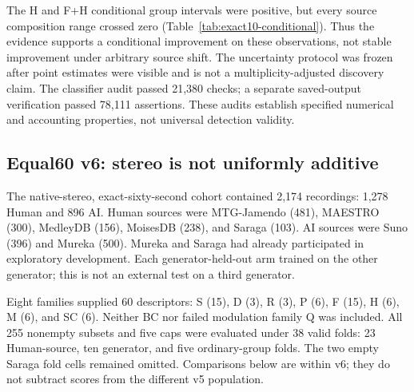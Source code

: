 The H and F+H conditional group intervals were positive, but every source
composition range crossed zero (Table~\ref{tab:exact10-conditional}). Thus the
evidence supports a conditional improvement on these observations, not stable
improvement under arbitrary source shift. The uncertainty protocol was frozen
after point estimates were visible and is not a multiplicity-adjusted discovery
claim. The classifier audit passed 21,380 checks; a separate saved-output
verification passed 78,111 assertions. These audits establish specified
numerical and accounting properties, not universal detection validity.

\subsection{Equal60 v6: stereo is not uniformly additive}

The native-stereo, exact-sixty-second cohort contained 2,174 recordings:
1,278 Human and 896 AI. Human sources were MTG-Jamendo (481), MAESTRO (300),
MedleyDB (156), MoisesDB (238), and Saraga (103). AI sources were Suno (396)
and Mureka (500). Mureka and Saraga had already participated in exploratory
development. Each generator-held-out arm trained on the other generator;
this is not an external test on a third generator.

Eight families supplied 60 descriptors: S (15), D (3), R (3), P (6), F (15),
H (6), M (6), and SC (6). Neither BC nor failed modulation family Q was
included. All 255 nonempty subsets and five caps were evaluated under 38
valid folds: 23 Human-source, ten generator, and five ordinary-group folds.
The two empty Saraga fold cells remained omitted. Comparisons below are within
v6; they do not subtract scores from the different v5 population.

